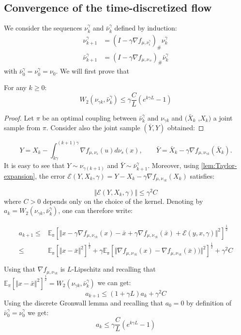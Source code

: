 \subsection{Convergence of the time-discretized flow}

We consider the sequences $\nu_{k}^{\gamma}$ and $\bar{\nu}_{k}^{\gamma}$
defined by induction: 
\begin{align*}
\nu_{k+1}^{\gamma} & =(I-\gamma\nabla f_{\mu,\nu_{^{k}}^{\gamma}})_{\#}\nu_{k}^{\gamma}\\
\bar{\nu}_{k+1}^{\gamma} & =(I-\gamma\nabla f_{\mu,\nu_{^{\gamma k}}})_{\#}\bar{\nu}_{k}^{\gamma}
\end{align*}
 with $\bar{\nu}_{0}^{\gamma}=\nu_{0}^{\gamma}=\nu_{0}$. We will
first prove that 
\begin{lemma}
\label{lem:euler_error_1}For any $k\geq0$:
\[
W_{2}(\nu_{\gamma k},\bar{\nu}_{k}^{\gamma})\le\gamma\frac{C}{L}(e^{k\gamma L}-1)
\]
\end{lemma}
\begin{proof}
Let $\pi$ be an optimal coupling between $\bar{\nu}_{k}^{\gamma}$
and $\nu_{\gamma k}$ and $(\bar{X}_{k}$ ,$X_{k})$ a joint sample
from $\pi$. Consider also the joint sample $(\bar{Y},Y)$ obtained:
\end{proof}
\[
Y=X_{k}-\int_{k\gamma}^{(k+1)\gamma}\nabla f_{\mu,\nu_{s}}(u)d\nu_{s}(x),\qquad\bar{Y}=\bar{X}_{k}-\gamma\nabla f_{\mu,\nu_{\gamma k}}(\bar{X}_{k}).
\]
It is easy to see that $Y\sim\nu_{\gamma(k+1)}$ and $\bar{Y}\sim\bar{\nu}_{k+1}^{\gamma}$.
Moreover, using \ref{lem:Taylor-expansion}, the error $\mathcal{E}(Y,X_{k},\gamma)=Y-X_{k}-\gamma\nabla f_{\mu,\nu_{\gamma k}}(X_{k})$
satisfies:

\[
\Vert\mathcal{E}(Y,X_{k},\gamma)\Vert\leq\gamma^{2}C
\]
where $C>0$ depends only on the choice of the kernel. Denoting by
$a_{k}=W_{2}(\nu_{\gamma k},\bar{\nu}_{k}^{\gamma})$, one can therefore
write:

\begin{align*}
a_{k+1}\leq & \mathbb{E_{\pi}}\left[\Vert x-\gamma\nabla f_{\mu,\nu_{\gamma k}}(x)-\bar{x}+\gamma\nabla f_{\mu,\nu_{\gamma k}}(\bar{x})+\mathcal{E}(y,x,\gamma)\Vert^{2}\right]^{\frac{1}{2}}\\
\leq & \mathbb{E_{\pi}}\left[\Vert x-\bar{x}\Vert^{2}\right]^{\frac{1}{2}}+\gamma\mathbb{E_{\pi}}\left[\Vert\nabla f_{\mu,\nu_{\gamma k}}(x)-\nabla f_{\mu,\nu_{\gamma k}}(\bar{x}))\Vert^{2}\right]^{\frac{1}{2}}+\gamma^{2}C\\
\\
\end{align*}
Using that $\nabla f_{\mu,\nu_{\gamma k}}$ is $L$-Lipschitz and
recalling that $\mathbb{E}_{\pi}\left[\Vert x-\bar{x}\Vert^{2}\right]^{\frac{1}{2}}=W_{2}(\nu_{\gamma k},\bar{\nu}_{k}^{\gamma})$
we can get:
\[
a_{k+1}\leq(1+\gamma L)a_{k}+\gamma^{2}C
\]
Using the discrete Gronwall lemma and recalling that $a_{0}=0$ by
definition of $\bar{\nu}_{0}^{\gamma}=\nu_{0}^{\gamma}$ we get:
\[
a_{k}\leq\gamma\frac{C}{L}(e^{k\gamma L}-1)
\]

